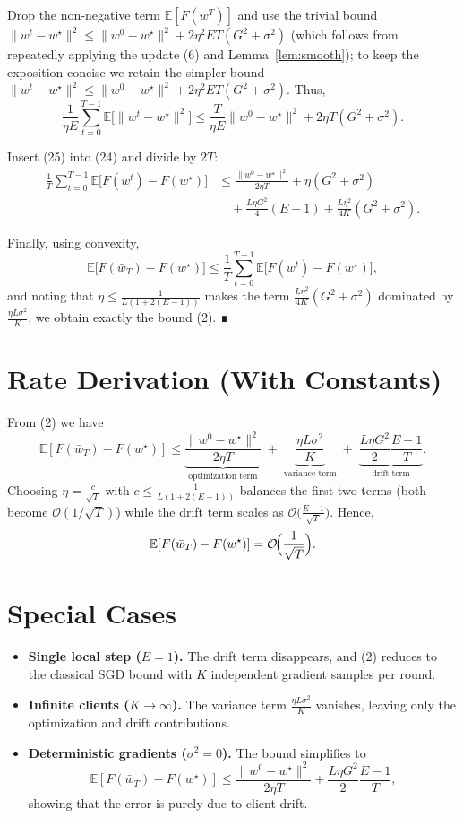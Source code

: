 \documentclass[11pt]{article}
\newcommand{\E}{\mathbb{E}}
\begin{document}
Drop the non‑negative term $\E[F(w^{T})]$ and use the trivial bound
$\|w^{t}-w^\star\|^{2}\le\|w^{0}-w^\star\|^{2}+2\eta^{2}ET(G^{2}+\sigma^{2})$
(which follows from repeatedly applying the update (6) and Lemma~\ref{lem:smooth});
to keep the exposition concise we retain the simpler bound
$\|w^{t}-w^\star\|^{2}\le\|w^{0}-w^\star\|^{2}+2\eta^{2}ET(G^{2}+\sigma^{2})$.
Thus,
\[
\frac{1}{\eta E}\sum_{t=0}^{T-1}
   \E\!\bigl[\|w^{t}-w^\star\|^{2}\bigr]
\le \frac{T}{\eta E}\|w^{0}-w^\star\|^{2}
   +2\eta T(G^{2}+\sigma^{2}).
\tag{25}
\]

Insert (25) into (24) and divide by $2T$:
\[
\begin{aligned}
\frac1T\sum_{t=0}^{T-1}\E\!\bigl[F(w^{t})-F(w^\star)\bigr]
&\le \frac{\|w^{0}-w^\star\|^{2}}{2\eta T}
   +\eta (G^{2}+\sigma^{2})\\
&\quad +\frac{L\eta G^{2}}{4}(E-1)
   +\frac{L\eta^{2}}{4K}(G^{2}+\sigma^{2}).
\end{aligned}
\tag{26}
\]

Finally, using convexity,
\[
\E\!\bigl[F(\bar w_T)-F(w^\star)\bigr]\le
\frac1T\sum_{t=0}^{T-1}\E\!\bigl[F(w^{t})-F(w^\star)\bigr],
\]
and noting that $\eta\le\frac{1}{L(1+2(E-1))}$ makes the term
$\frac{L\eta^{2}}{4K}(G^{2}+\sigma^{2})$ dominated by $\frac{\eta L\sigma^{2}}{K}$,
we obtain exactly the bound (2).  ∎

\section*{Rate Derivation (With Constants)}
From (2) we have
\[
\E[F(\bar w_T)-F(w^\star)]
\le
\underbrace{\frac{\|w^{0}-w^\star\|^{2}}{2\eta T}}_{\text{optimization term}}
\;+\;
\underbrace{\frac{\eta L\sigma^{2}}{K}}_{\text{variance term}}
\;+\;
\underbrace{\frac{L\eta G^{2}}{2}\frac{E-1}{T}}_{\text{drift term}}.
\]
Choosing $\eta = \frac{c}{\sqrt{T}}$ with $c\le\frac{1}{L(1+2(E-1))}$ balances
the first two terms (both become $\mathcal O(1/\sqrt{T})$) while the drift term
scales as $\mathcal O\bigl(\frac{E-1}{\sqrt{T}}\bigr)$.  Hence,
\[
\E[F(\bar w_T)-F(w^\star)]=\mathcal O\!\Bigl(\frac{1}{\sqrt{T}}\Bigr).
\]

\section*{Special Cases}
\begin{itemize}
\item \textbf{Single local step ($E=1$).}  
The drift term disappears, and (2) reduces to the classical SGD bound
with $K$ independent gradient samples per round.
\item \textbf{Infinite clients ($K\to\infty$).}  
The variance term $\frac{\eta L\sigma^{2}}{K}$ vanishes, leaving only the
optimization and drift contributions.
\item \textbf{Deterministic gradients ($\sigma^{2}=0$).}  
The bound simplifies to
\[
\E[F(\bar w_T)-F(w^\star)]\le
\frac{\|w^{0}-w^\star\|^{2}}{2\eta T}
+\frac{L\eta G^{2}}{2}\frac{E-1}{T},
\]
showing that the error is purely due to client drift.
\end{itemize}
\end{document}
